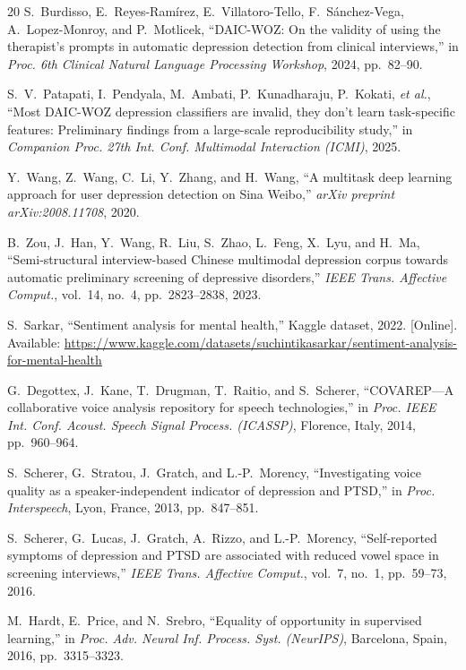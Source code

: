 \documentclass[5p,twocolumn]{elsarticle}
\begin{document}
\begin{thebibliography}{20}
S.~Burdisso, E.~Reyes-Ram\'irez, E.~Villatoro-Tello,
F.~S\'anchez-Vega, A.~Lopez-Monroy, and P.~Motlicek,
``DAIC-WOZ: On the validity of using the therapist's prompts
in automatic depression detection from clinical interviews,''
in \textit{Proc. 6th Clinical Natural Language Processing
Workshop}, 2024, pp.~82--90.

S.~V.~Patapati, I.~Pendyala, M.~Ambati, P.~Kunadharaju,
P.~Kokati, \emph{et al.},
``Most DAIC-WOZ depression classifiers are invalid, they don't
learn task-specific features: Preliminary findings from a
large-scale reproducibility study,'' in \textit{Companion Proc.
27th Int. Conf. Multimodal Interaction (ICMI)}, 2025.

Y.~Wang, Z.~Wang, C.~Li, Y.~Zhang, and H.~Wang,
``A multitask deep learning approach for user depression
detection on Sina Weibo,''
\textit{arXiv preprint arXiv:2008.11708}, 2020.

B.~Zou, J.~Han, Y.~Wang, R.~Liu, S.~Zhao, L.~Feng, X.~Lyu, and H.~Ma,
``Semi-structural interview-based Chinese multimodal depression
corpus towards automatic preliminary screening of depressive
disorders,''
\textit{IEEE Trans. Affective Comput.}, vol.~14, no.~4,
pp.~2823--2838, 2023.

S.~Sarkar,
``Sentiment analysis for mental health,''
Kaggle dataset, 2022. [Online]. Available:
\url{https://www.kaggle.com/datasets/suchintikasarkar/sentiment-analysis-for-mental-health}

G.~Degottex, J.~Kane, T.~Drugman, T.~Raitio, and S.~Scherer,
``COVAREP---A collaborative voice analysis repository for speech
technologies,'' in \textit{Proc. IEEE Int. Conf. Acoust. Speech
Signal Process. (ICASSP)}, Florence, Italy, 2014, pp.~960--964.

S.~Scherer, G.~Stratou, J.~Gratch, and L.-P.~Morency,
``Investigating voice quality as a speaker-independent indicator
of depression and PTSD,'' in \textit{Proc. Interspeech},
Lyon, France, 2013, pp.~847--851.

S.~Scherer, G.~Lucas, J.~Gratch, A.~Rizzo, and L.-P.~Morency,
``Self-reported symptoms of depression and PTSD are associated with
reduced vowel space in screening interviews,''
\textit{IEEE Trans. Affective Comput.}, vol.~7, no.~1,
pp.~59--73, 2016.

M.~Hardt, E.~Price, and N.~Srebro,
``Equality of opportunity in supervised learning,'' in
\textit{Proc. Adv. Neural Inf. Process. Syst. (NeurIPS)},
Barcelona, Spain, 2016, pp.~3315--3323.


\end{thebibliography}
\end{document}
